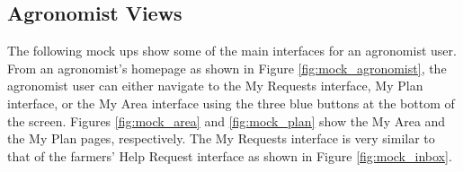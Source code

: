 \newpage
\subsection{Agronomist Views}
\noindent
The following mock ups show some of the main interfaces for an agronomist user. From an agronomist's homepage as shown in Figure \ref{fig:mock_agronomist}, the agronomist user can either navigate to the My Requests interface, My Plan interface, or the My Area interface using the three blue buttons at the bottom of the screen. Figures \ref{fig:mock_area} and \ref{fig:mock_plan} show the My Area and the My Plan pages, respectively. The My Requests interface is very similar to that of the farmers' Help Request interface as shown in Figure \ref{fig:mock_inbox}.

\begin{multicols}{2}
 

\end{multicols}
